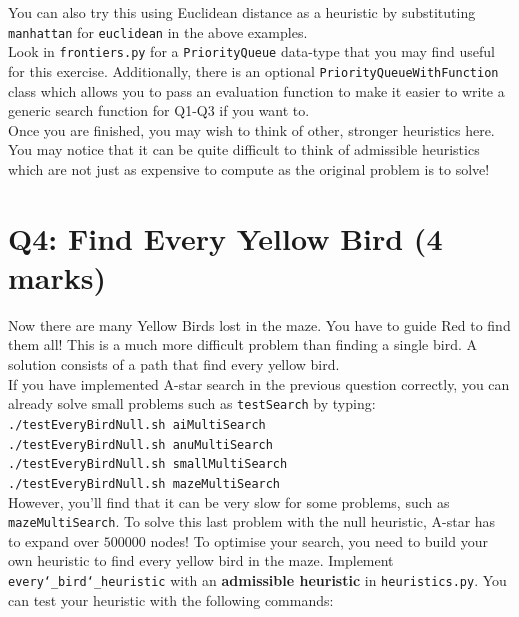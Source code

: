 \documentclass[12pt]{article}
\begin{document}
You can also try this using Euclidean distance as a heuristic by substituting
\texttt{manhattan} for \texttt{euclidean} in the above examples.\\

Look in \texttt{frontiers.py} for a \texttt{PriorityQueue} data-type that you may find useful
for this exercise. Additionally, there is an optional \texttt{PriorityQueueWithFunction} class
which allows you to pass an evaluation function to make it easier to write a
generic search function for Q1-Q3 if you want to.\\

Once you are finished, you may wish to think of other, stronger heuristics here.
You may notice that it can be quite difficult to think of admissible heuristics which are not
just as expensive to compute as the original problem is to solve!


\section{Q4: Find Every Yellow Bird (4 marks)}
Now there are many Yellow Birds lost in the maze. 
You have to guide Red to find them all!
%
This is a much more difficult problem than finding a single bird.
A solution consists of a path that find every yellow bird.\\

If you have implemented A-star search in the previous question correctly,
you can already solve small problems such as \texttt{testSearch} by typing:\\

\texttt{./testEveryBirdNull.sh aiMultiSearch}\\
\indent\texttt{./testEveryBirdNull.sh anuMultiSearch}\\
\indent\texttt{./testEveryBirdNull.sh smallMultiSearch}\\
\indent\texttt{./testEveryBirdNull.sh mazeMultiSearch}\\

However, you'll find that it can be very slow for some problems, such as \texttt{mazeMultiSearch}.
To solve this last problem with the null heuristic, A-star has to expand over $500000$ nodes!
%
To optimise your search, you need to build your own heuristic to find every yellow bird in the maze.
Implement \texttt{every\char`_bird\char`_heuristic} with an {\bf admissible heuristic} in \texttt{heuristics.py}.
You can test your heuristic with the following commands:\\
\end{document}
